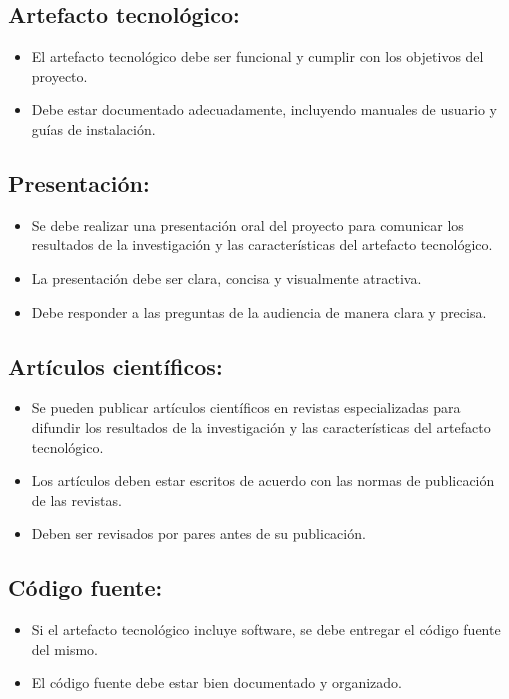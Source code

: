 \documentclass{article}
\begin{document}
\subsection{Artefacto tecnológico:}

\begin{itemize}
  \item El artefacto tecnológico debe ser funcional y cumplir con los objetivos del proyecto.
  \item Debe estar documentado adecuadamente, incluyendo manuales de usuario y guías de instalación.
\end{itemize}

\subsection{Presentación:}
\begin{itemize}
  \item Se debe realizar una presentación oral del proyecto para comunicar los resultados de la investigación y las características del artefacto tecnológico.
  \item La presentación debe ser clara, concisa y visualmente atractiva.
  \item Debe responder a las preguntas de la audiencia de manera clara y precisa.
\end{itemize}

\subsection{Artículos científicos:}
\begin{itemize}
  \item Se pueden publicar artículos científicos en revistas especializadas para difundir los resultados de la investigación y las características del artefacto tecnológico.
  \item Los artículos deben estar escritos de acuerdo con las normas de publicación de las revistas.
  \item Deben ser revisados por pares antes de su publicación.
\end{itemize}

\subsection{Código fuente:}
\begin{itemize}
  \item Si el artefacto tecnológico incluye software, se debe entregar el código fuente del mismo.
  \item El código fuente debe estar bien documentado y organizado.
\end{itemize}
\end{document}
